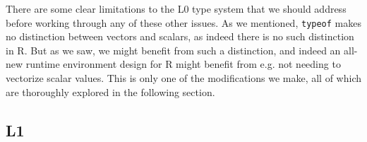 \documentclass[acmsmall,10pt,review,anonymous]{acmart}\settopmatter{printfolios=true,printccs=false,printacmref=false}
\newcommand{\code}[1]{\lstinline|#1|\xspace}
\begin{document}
%
%
%
%

There are some clear limitations to the L0 type system that we should
address before working through any of these other issues. As we mentioned,
\code{typeof} makes no distinction between vectors and scalars, as indeed
there is no such distinction in R.  But as we saw, we might benefit from
such a distinction, and indeed an all-new runtime environment design for R
might benefit from e.g. not needing to vectorize scalar values.  This is only one
of the modifications we make, all of which are thoroughly explored in
the following section.
%
%
%
%
\subsection{L1}
\end{document}
